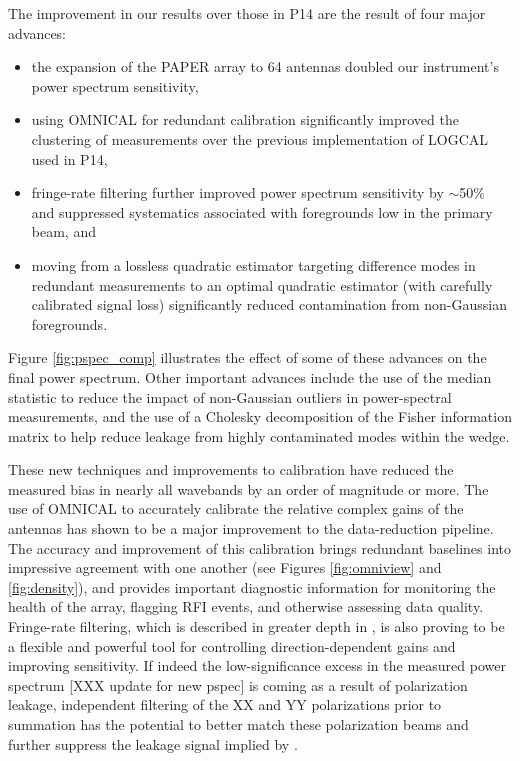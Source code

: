 \documentclass[twocolumn,numberedappendix]{emulateapj} \shorttitle{PSA64}
\begin{document}
The improvement in our results over those in P14 are the result of four
major advances:
\begin{itemize}
\item the expansion of the PAPER array to 64 antennas doubled our instrument's power spectrum sensitivity,
\item using OMNICAL for redundant calibration significantly improved the clustering of measurements
over the previous implementation of LOGCAL used in P14,
\item fringe-rate filtering further improved power spectrum sensitivity by $\sim$50\% and suppressed
systematics associated with foregrounds low in the primary beam, and
\item moving from a lossless quadratic estimator targeting difference modes
in redundant measurements to an optimal quadratic estimator (with carefully calibrated signal
loss) significantly reduced contamination from non-Gaussian foregrounds.
\end{itemize}
Figure \ref{fig:pspec_comp} illustrates the effect of some of these advances on the final
power spectrum.
Other important advances include the use of the median statistic to reduce the impact
of non-Gaussian outliers in power-spectral measurements, and the use of a Cholesky
decomposition of the Fisher information matrix to help reduce leakage 
from highly contaminated modes within the wedge.

These new techniques and improvements to calibration have reduced the measured
bias in nearly all wavebands by an order of magnitude or more. 
The use of
OMNICAL to accurately calibrate the relative complex gains of the antennas has
shown to be a major improvement to the data-reduction pipeline. The accuracy and improvement of
this calibration brings redundant baselines into impressive agreement with one another
(see Figures \ref{fig:omniview} and \ref{fig:density}),
and provides important diagnostic information for
monitoring the health of the
array, flagging RFI events, and otherwise assessing data quality.
Fringe-rate filtering, which is described in greater depth in \citep{parsons_et_al2015}, is also
proving to be a flexible and powerful tool for controlling direction-dependent gains and
improving sensitivity.  If indeed the low-significance excess in the measured power spectrum
[XXX update for new pspec]
is coming as a result of polarization leakage, independent filtering of the XX and YY polarizations
prior to summation has the potential to better match these polarization beams and further suppress 
the leakage signal implied by \citet{moore_et_al2015}.
\end{document}
